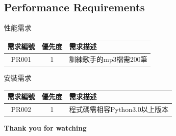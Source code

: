 \documentclass{article}
\begin{document}
\begin{CJK}{UTF8}{bkai}
\subsection{ \Large Performance Requirements}
\begin{center}
	性能需求\\
	\begin{tabular}{|c|c|p{8cm}|}\hline
		需求編號 & 優先度 & 需求描述 \\ \hline
		PR001 & 1 &訓練歌手的mp3檔需200筆  \\ \hline
	\end{tabular}
\end{center}
\begin{center}
	安裝需求\\
	\begin{tabular}{|c|c|p{8cm}|}\hline
		需求編號 & 優先度 & 需求描述 \\ \hline
		PR002 & 1 &程式碼需相容Python3.0以上版本  \\ \hline
	\end{tabular}
\end{center}
\newpage
\Huge\bf   Thank you for watching


\end{CJK}
\end{document}
